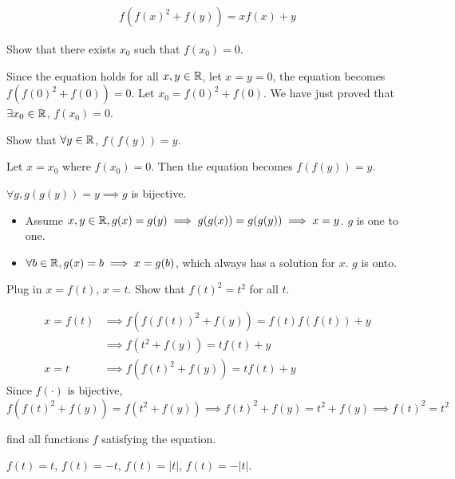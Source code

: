 \documentclass[11pt]{article}
\begin{document}
\newpage
{}

\begin{align*}
    f(f(x)^2 + f(y)) = xf(x) + y
\end{align*}

\begin{Parts}
    \Part Show that there exists $x_0$ such that $f(x_0)=0$. 
    \begin{Answer}
        Since the equation holds for all $x,y \in \mathbb{R}$, let $x=y=0$, the equation becomes $f(f(0)^2 + f(0)) = 0$. 
        Let $x_0=f(0)^2 + f(0)$. We have just proved that $\exists x_0 \in \mathbb{R}$, $f(x_0)=0$. 
    \end{Answer}

    \Part Show that $\forall y \in \mathbb{R}$, $f(f(y)) = y$. 
    \begin{Answer}
        Let $x=x_0$ where $f(x_0)=0$. Then the equation becomes $f(f(y)) = y$. 
    \end{Answer}

    \Part $\forall g, g(g(y))=y \implies g$ is bijective. 
    \begin{Answer}
        \begin{itemize}
            \item Assume $x,y \in \mathbb{R}, g(x)=g(y) \implies g(g(x)) = g(g(y)) \implies x = y$. $g$ is one to one. 
            \item $\forall b \in \mathbb{R}, g(x) = b \implies x = g(b)$, which always has a solution for $x$. $g$ is onto. 
        \end{itemize}
    \end{Answer}

    \Part Plug in $x=f(t)$, $x=t$. Show that $f(t)^2=t^2$ for all $t$. 
    \begin{Answer}
        \begin{align*}
            x=f(t)  &\implies f(f(f(t))^2 + f(y)) = f(t)f(f(t)) + y \\
                    &\implies f(t^2 + f(y)) = tf(t) + y \\
            x=t     &\implies f(f(t)^2 + f(y)) = tf(t) + y
        \end{align*}
        Since $f(\cdot)$ is bijective, $f(f(t)^2 + f(y)) = f(t^2 + f(y)) \implies f(t)^2 + f(y) = t^2 + f(y) \implies f(t)^2=t^2$
    \end{Answer}

    \Part find all functions $f$ satisfying the equation. 
    \begin{Answer}
        $f(t) = t$, $f(t) = -t$, $f(t) = |t|$, $f(t) = -|t|$. 
    \end{Answer}
\end{Parts}
\end{document}
